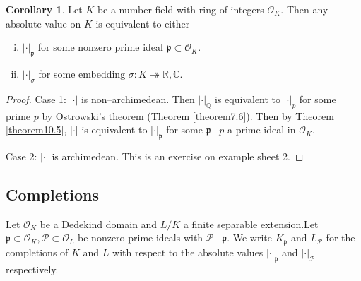 \documentclass{article}
\theoremstyle{definition}
\newtheorem{cor}[theorem]{Corollary}
\begin{document}
\begin{cor}
    Let $K$ be a number field with ring of integers $\mathcal{O}_K$. Then any absolute value on $K$ is equivalent to either 
    \begin{enumerate}[(i)]
        \item $|\cdot|_{\mathfrak{p}}$ for some nonzero prime ideal $\mathfrak{p} \subset \mathcal{O}_K$.
        \item $|\cdot|_{\sigma}$ for some embedding $\sigma : K \twoheadrightarrow \mathbb{R}, \mathbb{C}$.
    \end{enumerate}
\end{cor}
\begin{proof}
    Case 1: $|\cdot|$ is non--archimedean. Then $|\cdot|_{\mathbb{Q}}$ is equivalent to $|\cdot|_{p}$ for some prime $p$ by Ostrowski's theorem (Theorem \ref{theorem7.6}). Then by Theorem \ref{theorem10.5}, $|\cdot|$ is equivalent to $|\cdot|_{\mathfrak{p}}$ for some $\mathfrak{p} \mid p$ a prime ideal in $\mathcal{O}_K$.
    \vspace{1mm}
     
    Case 2: $|\cdot|$ is archimedean. This is an exercise on example sheet 2.
\end{proof}
\subsection{Completions}
Let $\mathcal{O}_K$ be a Dedekind domain and $L/K$ a finite separable extension.Let $\mathfrak{p} \subset \mathcal{O}_K, \mathcal{P} \subset \mathcal{O}_L$ be nonzero prime ideals with $\mathcal{P} \mid  \mathfrak{p}$. We write $K_{\mathfrak{p}}$ and $L_{\mathcal{P}}$ for the completions of $K$ and $L$ with respect to the absolute values $|\cdot|_{\mathfrak{p}}$ and $|\cdot|_{\mathcal{P}}$ respectively.
\end{document}
